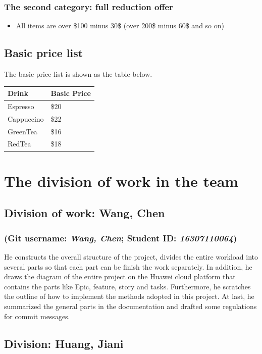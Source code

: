 \documentclass[a4paper]{report}
\begin{document}
\subsubsection{The second category: full reduction offer}
\begin{itemize}
\item
All items are over \$100 minus 30\$ (over 200\$ minus 60\$ and so on)
\end{itemize}
\subsection{Basic price list}
The basic price list is shown as the table below.

\begin{table}[htbp]
\center
\begin{tabular}{|l|l|}
\hline
\rowcolor[HTML]{575C61} 
{\color[HTML]{FFFFFF} \textbf{Drink}} & {\color[HTML]{FFFFFF} \textbf{Basic Price}} \\ \hline
Espresso&\$20\\\hline
Cappuccino&\$22\\\hline
GreenTea&\$16\\\hline
RedTea&\$18\\\hline
\end{tabular}
\end{table}
\section{The division of work in the team}
\subsection{Division of work: Wang, Chen}
\subsubsection{(Git username: \emph{Wang, Chen}; Student ID: \emph{16307110064})}
He constructs the overall structure of the project, divides the entire workload into several parts so that each part can be finish the work separately. In addition, he draws the diagram of the entire project on the Huawei cloud platform that contains the parts like Epic, feature, story and tasks. Furthermore, he scratches the outline of how to implement the methods adopted in this project. At last, he summarized the general parts in the documentation and drafted some regulations for commit messages.

\subsection{Division: Huang, Jiani}
\end{document}

